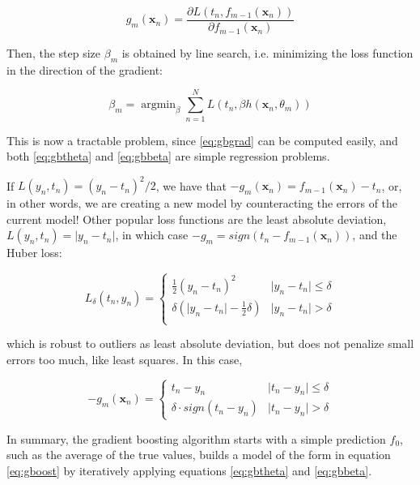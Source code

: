 \documentclass[a4paper,11pt]{kth-mag}
\DeclareMathOperator*{\argmin}{argmin}
\begin{document}
\begin{equation}
\label{eq:gbgrad}
g_m(\bm x_n)=\frac{\partial L(t_n,f_{m-1}(\bm x_n))}{\partial f_{m-1}(\bm x_n)}
\end{equation}

Then, the step size $\beta_m$ is obtained by line search, i.e. minimizing the loss function in the direction of the gradient:

\begin{equation}
\label{eq:gbbeta}
\beta_m=\argmin_{\beta}\sum_{n=1}^N L(t_n, \beta h(\bm x_n,\theta_m))
\end{equation}

This is now a tractable problem, since \ref{eq:gbgrad} can be computed easily, and both \ref{eq:gbtheta} and \ref{eq:gbbeta} are simple regression problems.

If $L(y_n,t_n)=(y_n-t_n)^2/2$, we have that $-g_m(\bm x_n)=f_{m-1}(\bm x_n)-t_n$, or, in other words, we are creating a new model by counteracting the errors of the current model! Other popular loss functions are the least absolute deviation, $L(y_n,t_n)=\vert y_n-t_n\vert$, in which case $-g_m=sign(t_n-f_{m-1}(\bm x_n))$, and the Huber loss:

\begin{equation}
\label{eq:huberloss}
L_\delta(t_n,y_n)=\begin{cases}
\frac{1}{2}(y_n-t_n)^2 & \vert y_n-t_n \vert \leq \delta \\
\delta(\vert y_n-t_n\vert-\frac{1}{2}\delta) & \vert y_n-t_n \vert > \delta \\
\end{cases}
\end{equation}

\noindent which is robust to outliers as least absolute deviation, but does not penalize small errors too much, like least squares. In this case,

\begin{equation}
-g_m(\bm x_n)=\begin{cases}
t_n-y_n & \vert t_n-y_n\vert\leq\delta \\
\delta\cdot sign(t_n-y_n) & \vert t_n-y_n\vert>\delta
\end{cases}
\end{equation}

In summary, the gradient boosting algorithm starts with a simple prediction $f_0$, such as the average of the true values, builds a model of the form in equation \ref{eq:gboost} by iteratively applying equations \ref{eq:gbtheta} and \ref{eq:gbbeta}.
\end{document}
